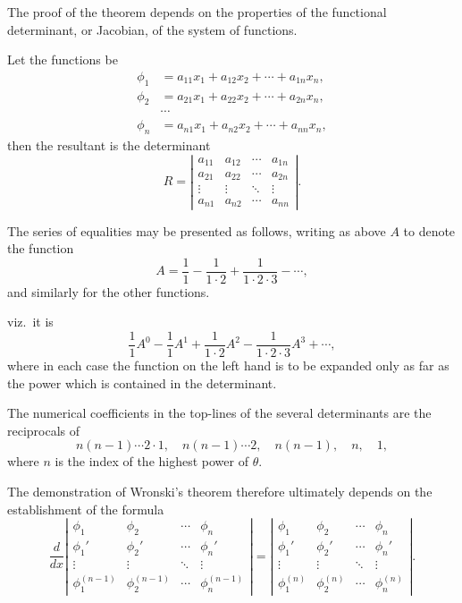 \documentclass[11pt,a4paper]{book}
\begin{document}
The proof of the theorem depends on the properties of the functional determinant, or Jacobian, of the system of functions.

\newpage

Let the functions be
\begin{align*}
\phi_1 &= a_{11}x_1 + a_{12}x_2 + \cdots + a_{1n}x_n, \\
\phi_2 &= a_{21}x_1 + a_{22}x_2 + \cdots + a_{2n}x_n, \\
&\cdots \\
\phi_n &= a_{n1}x_1 + a_{n2}x_2 + \cdots + a_{nn}x_n,
\end{align*}
then the resultant is the determinant
\[
R = \left| \begin{array}{cccc}
a_{11} & a_{12} & \cdots & a_{1n} \\
a_{21} & a_{22} & \cdots & a_{2n} \\
\vdots & \vdots & \ddots & \vdots \\
a_{n1} & a_{n2} & \cdots & a_{nn}
\end{array} \right|.
\]

The series of equalities may be presented as follows, writing as above $A$ to denote the function
\[
A = \frac{1}{1} - \frac{1}{1\cdot 2} + \frac{1}{1\cdot 2\cdot 3} - \cdots,
\]
and similarly for the other functions.

\newpage

viz.\ it is
\[
\frac{1}{1}A^0 - \frac{1}{1}A^1 + \frac{1}{1\cdot 2}A^2 - \frac{1}{1\cdot 2\cdot 3}A^3 + \cdots,
\]
where in each case the function on the left hand is to be expanded only as far as the power which is contained in the determinant.

The numerical coefficients in the top-lines of the several determinants are the reciprocals of
\[
n(n-1)\cdots 2\cdot 1, \quad n(n-1)\cdots 2, \quad n(n-1), \quad n, \quad 1,
\]
where $n$ is the index of the highest power of $\theta$.

\newpage

The demonstration of Wronski's theorem therefore ultimately depends on the establishment of the formula
\[
\frac{d}{dx}\left|\begin{array}{cccc}
\phi_1 & \phi_2 & \cdots & \phi_n \\
\phi_1' & \phi_2' & \cdots & \phi_n' \\
\vdots & \vdots & \ddots & \vdots \\
\phi_1^{(n-1)} & \phi_2^{(n-1)} & \cdots & \phi_n^{(n-1)}
\end{array}\right| = \left|\begin{array}{cccc}
\phi_1 & \phi_2 & \cdots & \phi_n \\
\phi_1' & \phi_2' & \cdots & \phi_n' \\
\vdots & \vdots & \ddots & \vdots \\
\phi_1^{(n)} & \phi_2^{(n)} & \cdots & \phi_n^{(n)}
\end{array}\right|.
\]
\end{document}
